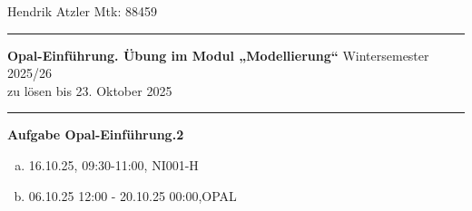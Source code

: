\documentclass[a4paper,12pt]{article}
\begin{document}
Hendrik Atzler \hfill Mtk: 88459

\rule{\textwidth}{0.4pt}


{\textbf{Opal-Einführung. Übung im Modul „Modellierung“ }\hfill Wintersemester 2025/26} \\
zu lösen bis 23. Oktober 2025 \\
\rule{\textwidth}{0.4pt}

{\large{\textbf{Aufgabe Opal-Einführung.2}}} \\
\begin{enumerate}[a.]
  \item 16.10.25, 09:30-11:00, NI001-H
  \item 06.10.25 12:00 - 20.10.25 00:00,OPAL
\end{enumerate}
\end{document}
